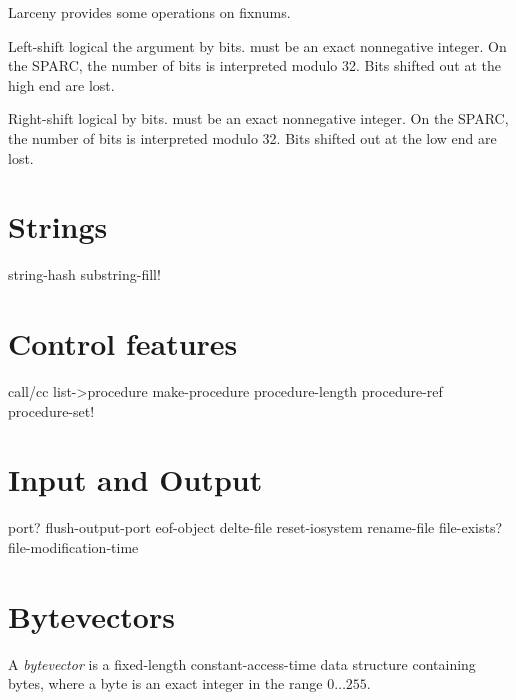 Larceny provides some operations on fixnums.


Left-shift logical the  argument by  bits.
 must be an exact nonnegative integer.  On the SPARC, the
number of bits is interpreted modulo 32.  Bits shifted out at the high
end are lost.


Right-shift logical  by  bits.   must
be an exact nonnegative integer.  On the SPARC, the number of bits is
interpreted modulo 32.  Bits shifted out at the low end are lost.




\section{Strings}

string-hash
substring-fill!

\section{Control features}

call/cc
list->procedure
make-procedure
procedure-length
procedure-ref
procedure-set!

\section{Input and Output}

port?
flush-output-port
eof-object
delte-file
reset-iosystem
rename-file
file-exists?
file-modification-time

\section{Bytevectors}

A {\em bytevector} is a fixed-length constant-access-time data structure
containing bytes, where a byte is an exact integer in the range $0\ldots
255$.  




